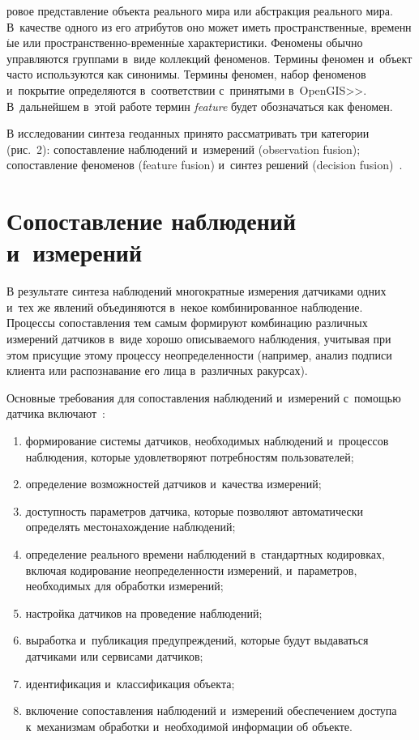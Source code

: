 \begin{multicols}{2}
\addtocounter{figure}{1}



\noindent
ро\-вое представление объекта реального мира или абстракция реального 
мира. В~качестве одного из его атрибутов оно может иметь пространственные, 
временн$\acute{\mbox{ы}}$е или про\-стран\-ст\-вен\-но-вре\-мен\-н$\acute{\mbox{ы}}$е характеристики. Феномены обычно 
управляются группами в~виде коллекций феноменов. Термины феномен 
и~объект часто используются как синонимы. Термины феномен, набор 
феноменов и~покрытие определяются в~соответствии с~принятыми 
в~OpenGIS>>. В~дальнейшем в~этой работе термин \textit{feature} будет 
обозначаться как феномен.
     
     В исследовании синтеза геоданных принято рассматривать три категории 
(рис.~2): сопоставление наблюдений и~измерений (observation fusion); 
сопоставление феноменов (feature fusion) и~синтез решений (decision 
fusion)~\cite{5-dul}. 
     

\section{Сопоставление наблюдений и~измерений}

     В результате синтеза наблюдений многократные измерения датчиками 
одних и~тех же явлений объединяются в~некое комбинированное наблюдение. 
Процессы сопоставления тем самым формируют комбинацию различных 
измерений датчиков в~виде хорошо описываемого наблюдения, учитывая при 
этом присущие этому процессу неопределенности (например, анализ подписи 
клиента или распознавание его лица в~различных ракурсах). 
     
     Основные требования для сопоставления наблюдений и~измерений 
с~помощью датчика включают~\cite{6-dul}:
     \begin{enumerate}[(1)]
\item формирование системы датчиков, необходимых наблюдений 
и~процессов наблюдения, которые удовлетворяют потребностям 
пользователей;
\item определение возможностей датчиков и~качества измерений; 
\item доступность параметров датчика, которые позволяют автоматически 
определять мес\-то\-на\-хож\-де\-ние наблюдений;
\item определение реального времени наблюдений в~стандартных 
кодировках, включая кодирование неопределенности измерений, 
и~па\-ра\-мет\-ров, необходимых для обработки измерений; 
\item настройка датчиков на проведение наблюдений; 
\item выработка и~публикация предупреждений, которые будут выдаваться 
датчиками или сервисами датчиков; 
\item идентификация и~классификация объекта; 
\item включение сопоставления наблюдений и~измерений обеспечением 
доступа к~механизмам обработки и~необходимой информации об объекте. 
\end{enumerate}


\end{multicols}
